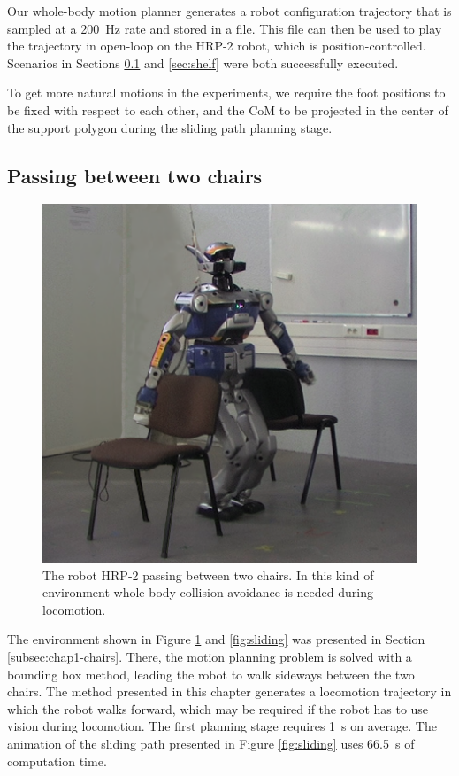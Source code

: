 Our whole-body motion planner generates a robot configuration
trajectory that is sampled at a 200~Hz rate and stored in a file. This
file can then be used to play the trajectory in open-loop on the HRP-2
robot, which is position-controlled. Scenarios in Sections
\ref{sec:chairs} and \ref{sec:shelf} were both successfully executed.

To get more natural motions in the experiments, we require the foot
positions to be fixed with respect to each other, and the CoM to be
projected in the center of the support polygon during the sliding path
planning stage.

\subsection{Passing between two chairs}
\label{sec:chairs}

\begin{figure}
\centering
\includegraphics[width=0.6\linewidth]
                {src/chap2-wholebody-planning/pics/chairs/couv.png}
\caption{The robot HRP-2 passing between two chairs. In this kind of
  environment whole-body collision avoidance is needed during
  locomotion.}
\label{fig:couv}
\end{figure}

The environment shown in Figure \ref{fig:couv} and \ref{fig:sliding}
was presented in Section \ref{subsec:chap1-chairs}. There, the motion
planning problem is solved with a bounding box method, leading the
robot to walk sideways between the two chairs. The method presented in
this chapter generates a locomotion trajectory in which the robot
walks forward, which may be required if the robot has to use vision
during locomotion. The first planning stage requires 1~s on average.
The animation of the sliding path presented in Figure
\ref{fig:sliding} uses 66.5~s of computation time.

